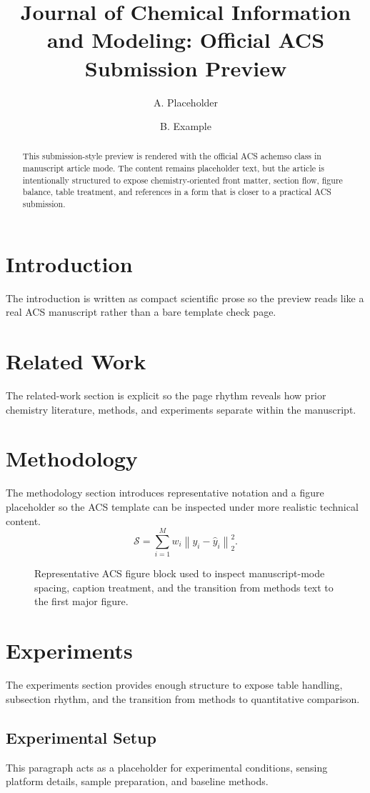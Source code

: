 \documentclass[manuscript=article]{achemso}
\author{A. Placeholder}
\affiliation{Department of Verified Templates, Placeholder Institute, Placeholder City, Country}
\author{B. Example}
\affiliation{Journal Systems Lab, Example University, Example City, Country}
\title{Journal of Chemical Information and Modeling: Official ACS Submission Preview}
\begin{document}
\begin{abstract}
This submission-style preview is rendered with the official ACS achemso class in manuscript article mode. The content remains placeholder text, but the article is intentionally structured to expose chemistry-oriented front matter, section flow, figure balance, table treatment, and references in a form that is closer to a practical ACS submission.
\end{abstract}
\section{Introduction}
The introduction is written as compact scientific prose so the preview reads like a real ACS manuscript rather than a bare template check page.
\section{Related Work}
The related-work section is explicit so the page rhythm reveals how prior chemistry literature, methods, and experiments separate within the manuscript.
\section{Methodology}
The methodology section introduces representative notation and a figure placeholder so the ACS template can be inspected under more realistic technical content.
\begin{equation}
\mathcal{S} = \sum_{i=1}^{M} w_i \left\| y_i - \hat{y}_i \right\|_2^2.
\end{equation}
\begin{figure}[ht]
\centering
{}
\caption{Representative ACS figure block used to inspect manuscript-mode spacing, caption treatment, and the transition from methods text to the first major figure.}
\end{figure}
\section{Experiments}
The experiments section provides enough structure to expose table handling, subsection rhythm, and the transition from methods to quantitative comparison.
\subsection{Experimental Setup}
This paragraph acts as a placeholder for experimental conditions, sensing platform details, sample preparation, and baseline methods.
\end{document}

